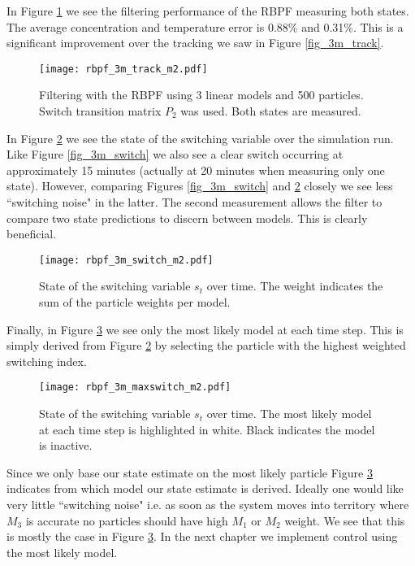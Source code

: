In Figure \ref{fig_3m_track_m2} we see the filtering performance of the RBPF measuring both states. The average concentration and temperature error is 0.88\% and 0.31\%. This is a significant improvement over the tracking we saw in Figure \ref{fig_3m_track}.
\begin{figure}[H] 
\centering
\texttt{[image: rbpf\_3m\_track\_m2.pdf]}
\caption{Filtering with the RBPF using 3 linear models and 500 particles. Switch transition matrix $P_2$ was used. Both states are measured.}
\label{fig_3m_track_m2}
\end{figure}
In Figure \ref{fig_3m_switch_m2} we see the state of the switching variable over the simulation run. Like Figure \ref{fig_3m_switch} we also see a clear switch occurring at approximately 15 minutes (actually at 20 minutes when measuring only one state). However, comparing Figures \ref{fig_3m_switch} and \ref{fig_3m_switch_m2} closely we see less ``switching noise" in the latter. The second measurement allows the filter to compare two state predictions to discern between models. This is clearly beneficial.
\begin{figure}[H] 
\centering
\texttt{[image: rbpf\_3m\_switch\_m2.pdf]}
\caption{State of the switching variable $s_t$ over time. The weight indicates the sum of the particle weights per model.}
\label{fig_3m_switch_m2}
\end{figure}
Finally, in Figure \ref{fig_3m_maxswitch} we see only the most likely model at each time step. This is simply derived from Figure \ref{fig_3m_switch_m2} by selecting the particle with the highest weighted switching index.
\begin{figure}[H] 
\centering
\texttt{[image: rbpf\_3m\_maxswitch\_m2.pdf]}
\caption{State of the switching variable $s_t$ over time. The most likely model at each time step is highlighted in white. Black indicates the model is inactive.}
\label{fig_3m_maxswitch}
\end{figure}
Since we only base our state estimate on the most likely particle Figure \ref{fig_3m_maxswitch} indicates from which model our state estimate is derived. Ideally one would like very little ``switching noise" i.e. as soon as the system moves into territory where $M_3$ is accurate no particles should have high $M_1$ or $M_2$ weight. We see that this is mostly the case in Figure \ref{fig_3m_maxswitch}. In the next chapter we implement control using the most likely model.